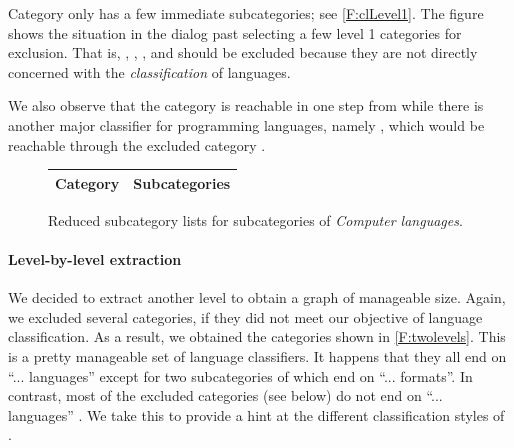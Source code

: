 
Category  only has a few immediate subcategories; see \autoref{F:clLevel1}. The figure shows the situation in the \WikiTax{} dialog past selecting a few level 1 categories for exclusion. That is, , , , and  should be excluded because they are not directly concerned with the \emph{classification} of languages.

We also observe that the category  is reachable in one step from  while there is another major classifier for programming languages, namely , which would be reachable through the excluded category .


\begin{figure}[t!]
{\footnotesize

\begin{center}
\noindent
\begin{tabular}{l|p{3.4in}}
\textbf{Category} & \textbf{Subcategories} \\\hline

\end{tabular}
\end{center}

\vspace{-42\in}

}
\caption{Reduced subcategory lists for subcategories of \emph{Computer languages}.}
\label{F:twolevels}
\vspace{-42\in}
\end{figure}


\paragraph*{\textbf{Level-by-level extraction}}

We decided to extract another level to obtain a graph of manageable size. Again, we excluded several categories, if they did not meet our objective of language classification. As a result, we obtained the categories shown in \autoref{F:twolevels}. This is a pretty manageable set of language classifiers. 
It happens that they all end on ``... languages'' except for two subcategories of  which end on ``... formats''. In contrast, most of the excluded categories (see below) do not end on ``... languages'' . We take this to provide a hint at the different classification styles of \Wikipedia.

